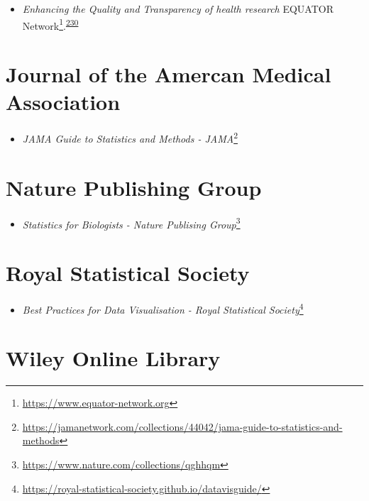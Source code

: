\documentclass[
  a4paper,
]{book}
\providecommand{\tightlist}{%
  \setlength{\itemsep}{0pt}\setlength{\parskip}{0pt}}
\renewcommand{\href}[2]{#2\footnote{\url{#1}}}
\begin{document}
\begin{itemize}
\tightlist
\item
  \emph{Enhancing the Quality and Transparency of health research} \href{https://www.equator-network.org}{EQUATOR Network}.\textsuperscript{\protect\hyperlink{ref-Altman2008}{230}}
\end{itemize}

\hypertarget{journal-of-the-amercan-medical-association}{%
\section*{Journal of the Amercan Medical Association}\label{journal-of-the-amercan-medical-association}}

\begin{itemize}
\tightlist
\item
  \href{https://jamanetwork.com/collections/44042/jama-guide-to-statistics-and-methods}{\emph{JAMA Guide to Statistics and Methods - JAMA}}
\end{itemize}

\hypertarget{nature-publishing-group}{%
\section*{Nature Publishing Group}\label{nature-publishing-group}}

\begin{itemize}
\tightlist
\item
  \href{https://www.nature.com/collections/qghhqm}{\emph{Statistics for Biologists - Nature Publising Group}}
\end{itemize}

\hypertarget{royal-statistical-society}{%
\section*{Royal Statistical Society}\label{royal-statistical-society}}

\begin{itemize}
\tightlist
\item
  \href{https://royal-statistical-society.github.io/datavisguide/}{\emph{Best Practices for Data Visualisation - Royal Statistical Society}}
\end{itemize}

\hypertarget{wiley-online-library}{%
\section*{Wiley Online Library}\label{wiley-online-library}}
\end{document}
